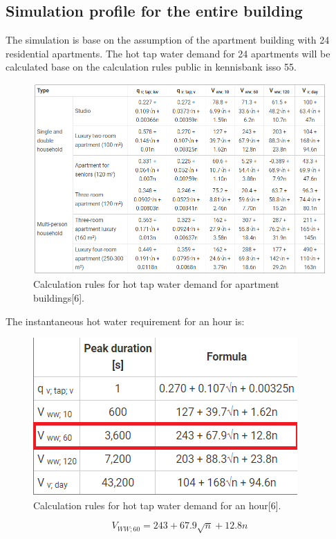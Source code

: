 \documentclass[a4paper,10pt]{article}
\begin{document}
\subsection{Simulation profile for the entire building}

The simulation is base on the assumption of the apartment building with 24 residential apartments.
The hot tap water demand for 24 apartments will be calculated base on the calculation rules public in kennisbank isso 55.

\begin{figure}[H]
\centering
\includegraphics[width=1\columnwidth]{pictures/Calculation rules for hot tap water demand for apartment buildings.png}
\caption[Short title]{Calculation rules for hot tap water demand for apartment buildings[6].}
\label{fig:ff9}\end{figure}
The instantaneous hot water requirement for an hour is:

\begin{figure}[H]
\centering
\includegraphics[width=0.5\columnwidth]{pictures/tap water demand in an hour.png}
\caption[Short title]{Calculation rules for hot tap water demand for an hour[6].}
\label{fig:ff10}\end{figure}

\begin{equation}
V_{WW;60} = 243 + 67.9\sqrt{n} + 12.8n
\end{equation}
\end{document}
